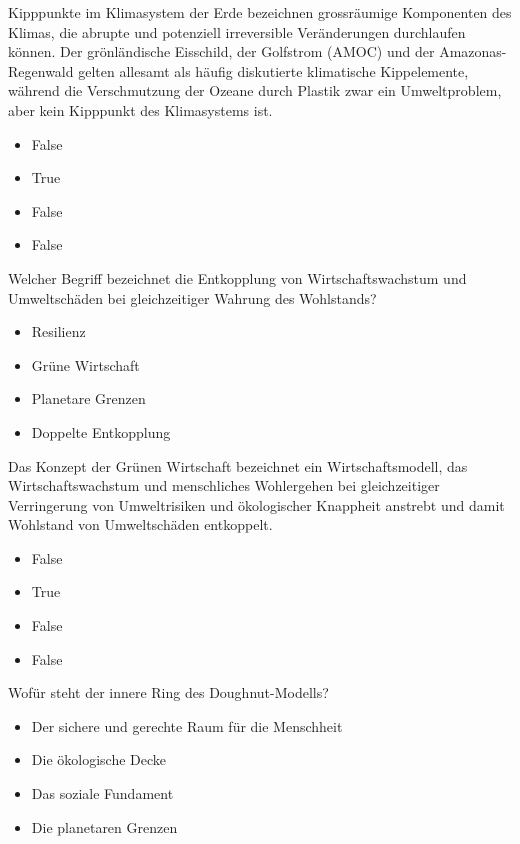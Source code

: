 \documentclass[
  nswissgerman,
  a4paper,
  DIV=11,
  numbers=noendperiod,
  oneside,
  openany]{scrreprt}
\providecommand{\tightlist}{%
  \setlength{\itemsep}{0pt}\setlength{\parskip}{0pt}}
\begin{document}
Kipppunkte im Klimasystem der Erde bezeichnen grossräumige Komponenten
des Klimas, die abrupte und potenziell irreversible Veränderungen
durchlaufen können. Der grönländische Eisschild, der Golfstrom (AMOC)
und der Amazonas-Regenwald gelten allesamt als häufig diskutierte
klimatische Kippelemente, während die Verschmutzung der Ozeane durch
Plastik zwar ein Umweltproblem, aber kein Kipppunkt des Klimasystems
ist.

\begin{itemize}
\tightlist
\item
  False
\item
  True
\item
  False
\item
  False
\end{itemize}

Welcher Begriff bezeichnet die Entkopplung von Wirtschaftswachstum und
Umweltschäden bei gleichzeitiger Wahrung des Wohlstands?

\begin{itemize}
\tightlist
\item[$\square$]
  Resilienz
\item[$\square$]
  Grüne Wirtschaft
\item[$\square$]
  Planetare Grenzen
\item[$\square$]
  Doppelte Entkopplung
\end{itemize}

Das Konzept der Grünen Wirtschaft bezeichnet ein Wirtschaftsmodell, das
Wirtschaftswachstum und menschliches Wohlergehen bei gleichzeitiger
Verringerung von Umweltrisiken und ökologischer Knappheit anstrebt und
damit Wohlstand von Umweltschäden entkoppelt.

\begin{itemize}
\tightlist
\item
  False
\item
  True
\item
  False
\item
  False
\end{itemize}

Wofür steht der innere Ring des Doughnut-Modells?

\begin{itemize}
\tightlist
\item[$\square$]
  Der sichere und gerechte Raum für die Menschheit
\item[$\square$]
  Die ökologische Decke
\item[$\square$]
  Das soziale Fundament
\item[$\square$]
  Die planetaren Grenzen
\end{itemize}
\end{document}

